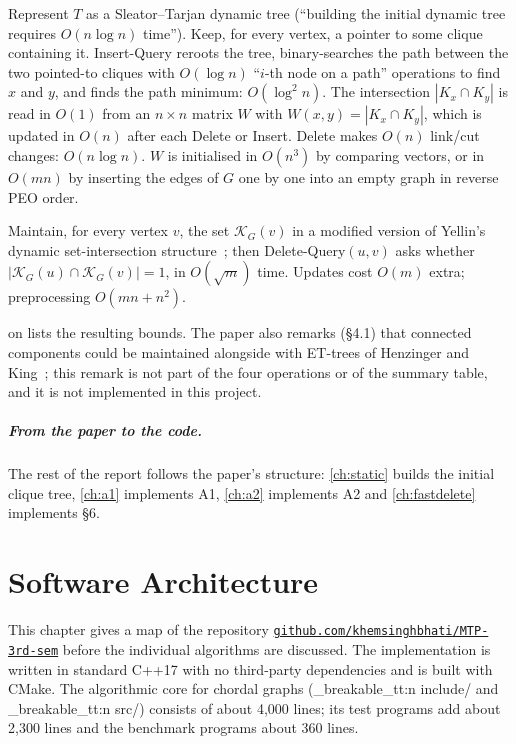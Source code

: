 \documentclass[11pt,a4paper,oneside]{report}
\theoremstyle{plain}
\theoremstyle{definition}
\theoremstyle{remark}
\newcommand{\op}[1]{\textsf{#1}}
\DeclareRobustCommand{\file}[1]{\mtp_breakable_tt:n {#1}}
\newcommand{\KG}{\mathcal{K}_G}
\newcommand{\repo}{\href{https://github.com/khemsinghbhati/MTP-3rd-sem}{\nolinkurl{github.com/khemsinghbhati/MTP-3rd-sem}}}
\begin{document}
\begin{paperbox}
Represent \(T\) as a Sleator--Tarjan dynamic tree (``building the initial dynamic tree requires
\(O(n\log n)\) time''). Keep, for every vertex, a pointer to some clique containing it.
\op{Insert-Query} reroots the tree, binary-searches the path between the two pointed-to
cliques with \(O(\log n)\) ``\(i\)-th node on a path'' operations to find \(x\) and \(y\), and
finds the path minimum: \(O(\log^2 n)\). The intersection \(|K_x\cap K_y|\) is read in
\(O(1)\) from an \(n\times n\) matrix \(W\) with \(W(x,y)=|K_x\cap K_y|\), which is updated in
\(O(n)\) after each \op{Delete} or \op{Insert}. \op{Delete} makes \(O(n)\) link/cut changes:
\(O(n\log n)\). \(W\) is initialised in \(O(n^3)\) by comparing vectors, or in \(O(mn)\) by
inserting the edges of \(G\) one by one into an empty graph in reverse PEO order.
\end{paperbox}

\begin{paperbox}[Ibarra \S6 (pp.\,40:13--40:16) --- faster \op{Delete-Query}, A1\(^+\)/A2\(^+\)]
Maintain, for every vertex \(v\), the set \(\KG(v)\) in a modified version of Yellin's dynamic
set-intersection structure~\cite{yellin1994}; then \op{Delete-Query}\((u,v)\) asks whether
\(|\KG(u)\cap\KG(v)|=1\), in \(O(\sqrt m)\) time. Updates cost \(O(m)\) extra; preprocessing
\(O(mn+n^2)\).
\end{paperbox}

 on  lists the resulting bounds. The paper
also remarks (\S4.1) that connected components could be maintained alongside with ET-trees of
Henzinger and King~\cite{henzinger1999}; this remark is not part of the four operations or of the summary table, and
it is not implemented in this project.

\paragraph{From the paper to the code.} The rest of the report follows the paper's structure:
\cref{ch:static} builds the initial clique tree, \cref{ch:a1} implements A1, \cref{ch:a2}
implements A2 and \cref{ch:fastdelete} implements \S6.
\chapter{Software Architecture}\label{ch:architecture}
This chapter gives a map of the repository \repo{} before the individual algorithms are
discussed. The implementation is written in standard C++17 with no third-party dependencies
and is built with CMake. The algorithmic core for chordal graphs (\file{include/} and
\file{src/}) consists of about 4{,}000 lines; its test programs add about 2{,}300 lines and the
benchmark programs about 360 lines.
\end{document}
